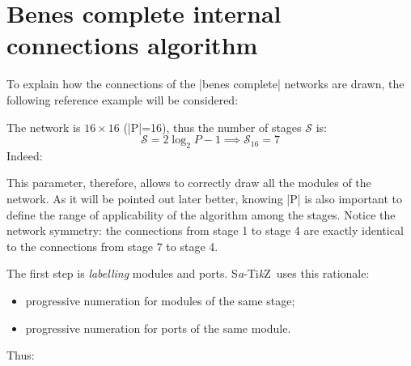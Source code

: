 \documentclass{ltxdoc}
\newcommand\Tikz{Ti\textit kZ}
\newcommand{\saTikZ}{S\textit{a}-\Tikz}
\begin{document}
\section{Benes complete internal connections algorithm}
\label{sec:benesconnalg}
To explain how the connections of the |benes complete| networks are drawn, the following reference example will be considered:
\begin{center}
\scalebox{0.75}{
	\begin{tikzpicture}[module size=0.75cm, module ysep=1, module xsep=2.5]
		\node[P=16, benes complete]{};
	\end{tikzpicture}
}
\end{center}
The network is $16\times 16$ (|P|=16), thus the number of stages $\mathcal{S}$ is:
\[\mathcal{S}=2\log_2{P}-1 \implies \mathcal{S}_{16}=7\]
Indeed:
\begin{center}
\end{center}
This parameter, therefore, allows to correctly draw all the modules of the network. As it will be pointed out later better, knowing |P| is also important to define the range of applicability of the algorithm among the stages. Notice the network symmetry: the connections from stage 1 to stage 4 are exactly identical to the connections from stage 7 to stage 4.  
\pagebreak

The first step is \emph{labelling} modules and ports. \saTikZ\ uses this rationale:
\begin{itemize}
\item progressive numeration for modules of the same stage;
\item progressive numeration for ports of the same module.
\end{itemize}

Thus:
\begin{center}
\end{center}
\end{document}

